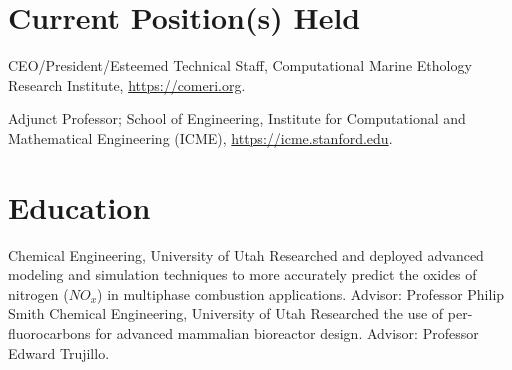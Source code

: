 \documentclass[letterpaper]{twentysecondcv_spd} %
\begin{document}
\section{Current Position(s) Held}

\begin{twentyshort}

	
	 {CEO/President/Esteemed Technical Staff, Computational Marine Ethology Research Institute, \underline{https://comeri.org}.}

  	 {Adjunct Professor; School of Engineering, Institute for Computational and Mathematical Engineering (ICME), \underline{https://icme.stanford.edu}.}
		
  \end{twentyshort}
  
\section{Education}

\begin{twenty}
	 {\normalfont Chemical Engineering, University of Utah} {Researched and deployed advanced
modeling and simulation techniques to more accurately predict the oxides of nitrogen ($NO_x$) in multiphase combustion applications. Advisor: Professor Philip Smith}
	 {\normalfont Chemical Engineering, University of Utah} {Researched the use of per-fluorocarbons for advanced mammalian bioreactor design. Advisor: Professor Edward Trujillo.}
	
\end{twenty}

\end{document}

